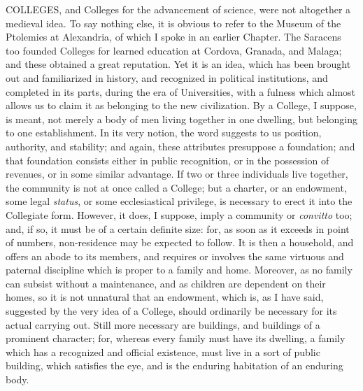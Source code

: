 
COLLEGES,
and Colleges for the advancement of science, were not altogether a
medieval idea. To say nothing else, it is obvious to refer to the
Museum of the Ptolemies at Alexandria, of which I spoke in an earlier
Chapter. The Saracens too founded Colleges for learned education at
Cordova, Granada, and Malaga; and these obtained a great reputation.
Yet it is an idea, which has been brought out and familiarized in
history, and recognized in political institutions, and completed in
its parts, during the era of Universities, with a fulness which almost
allows us to claim it as belonging to the new civilization. By a
College, I suppose, is meant, not merely a body of men living together
in one dwelling, but belonging to one establishment. In its very
notion, the word suggests to us position, authority, and stability;
and again, these attributes presuppose a foundation; and that
foundation consists either in public recognition, or in the possession
of revenues, or in some similar advantage. If two or three individuals
live together, the community is not at once called a College; but a
charter, or an endowment, some legal \emph{status}, or some
ecclesiastical privilege, is necessary to erect it into the Collegiate
form. However, it does, I suppose, imply a community or \emph{convitto}
too; and, if so, it must be of a certain definite size: for, as soon
as it exceeds in point of numbers, non-residence may be expected to
follow. It is then a household, and offers an abode to its members,
and requires or involves the same virtuous and paternal discipline
which is proper to a family and home. Moreover, as no family can
subsist without a maintenance, and as children are dependent on their
homes, so it is not unnatural that an endowment, which is, as I have
said, suggested by the very idea of a College, should ordinarily be
necessary for its actual carrying out. Still more necessary are
buildings, and buildings of a prominent character; for, whereas every
family must have its dwelling, a family which has a recognized and
official existence, must live in a sort of public building, which
satisfies the eye, and is the enduring habitation of an enduring body.


